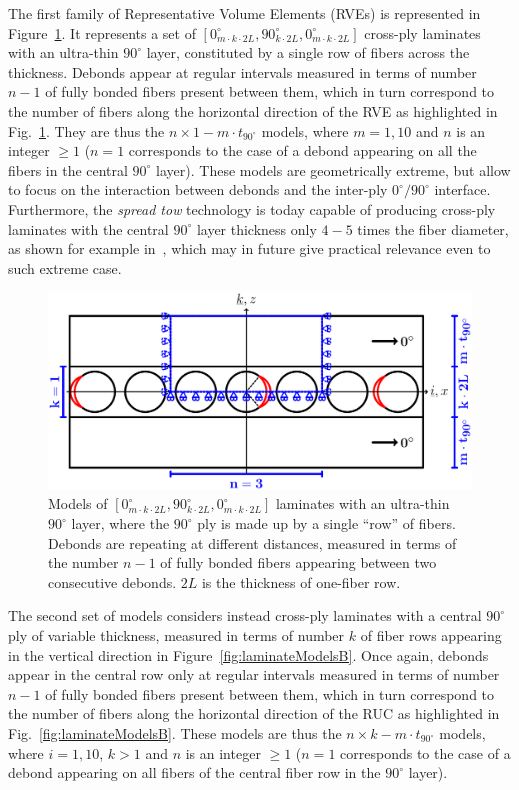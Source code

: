 \documentclass[review]{elsarticle}
\begin{document}
The first family of Representative Volume Elements (RVEs) is represented in Figure~\ref{fig:laminateModelsA}. It represents a set of $\left[0_{m\cdot k\cdot2L}^{\circ},90_{k\cdot2L}^{\circ},0_{m\cdot k\cdot2L}^{\circ}\right]$ cross-ply laminates with an ultra-thin $90^{\circ}$ layer, constituted by a single row of fibers across the thickness. Debonds appear at regular intervals measured in terms of number $n-1$ of fully bonded fibers present between them, which in turn correspond to the number of fibers along the horizontal direction of the RVE as highlighted in Fig.~\ref{fig:laminateModelsA}. They are thus the $n\times1-m\cdot t_{90^{\circ}}$ models, where $m=1,10$ and $n$ is an integer $\geq1$ ($n=1$ corresponds to the case of a debond appearing on all the fibers in the central $90^{\circ}$ layer). These models are geometrically extreme, but allow to focus on the interaction between debonds and the inter-ply $0^{\circ}/90^{\circ}$ interface. Furthermore, the \emph{spread tow} technology is today capable of producing cross-ply laminates with the central $90^{\circ}$ layer thickness only $4-5$ times the fiber diameter, as shown for example in~\cite{Saito2012}, which may in future give practical relevance even to such extreme case.

\begin{figure}[!h]
\centering
  \includegraphics[width=\textwidth]{thinPly.pdf}
\caption{Models of $\left[0_{m\cdot k\cdot2L}^{\circ},90_{k\cdot2L}^{\circ},0_{m\cdot k\cdot2L}^{\circ}\right]$ laminates with an ultra-thin $90^{\circ}$ layer, where the $90^{\circ}$ ply is made up by a single ``row'' of fibers. Debonds are repeating at different distances, measured in terms of the number $n-1$ of fully bonded fibers appearing between two consecutive debonds. $2L$ is the thickness of one-fiber row.}\label{fig:laminateModelsA}
\end{figure}

The second set of models considers instead cross-ply laminates with a central $90^{\circ}$ ply of variable thickness, measured in terms of number $k$ of fiber rows appearing in the vertical direction in Figure~\ref{fig:laminateModelsB}. Once again, debonds appear in the central row only at regular intervals measured in terms of number $n-1$ of fully bonded fibers present between them, which in turn correspond to the number of fibers along the horizontal direction of the RUC as highlighted in Fig.~\ref{fig:laminateModelsB}. These models are thus the $n\times k-m\cdot t_{90^{\circ}}$ models, where $i=1,10$, $k>1$ and $n$ is an integer $\geq1$ ($n=1$ corresponds to the case of a debond appearing on all fibers of the central fiber row in the $90^{\circ}$ layer).
\end{document}
